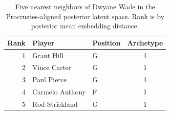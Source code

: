 \begin{table}[htbp]
  \centering\small
  \begin{tabular}{rllc}
    \toprule
    Rank & Player & Position & Archetype \\
    \midrule
    1 & Grant Hill & G & 1 \\
    2 & Vince Carter & G & 1 \\
    3 & Paul Pierce & G & 1 \\
    4 & Carmelo Anthony & F & 1 \\
    5 & Rod Strickland & G & 1 \\
    \bottomrule
  \end{tabular}
  \caption{Five nearest neighbors of Dwyane Wade in the Procrustes-aligned posterior latent space. Rank is by posterior mean embedding distance.}
  \label{tab:Dwyane_Wade_neighbors}
\end{table}

